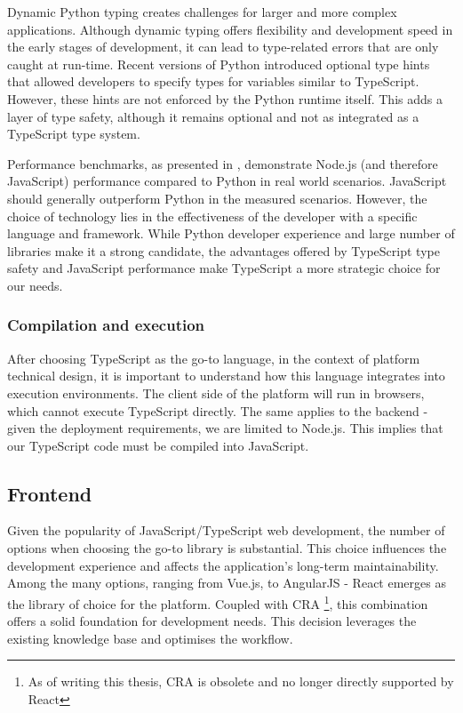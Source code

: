Dynamic Python typing creates challenges for larger and more complex applications.
Although dynamic typing offers flexibility and development speed in the early stages of development, it can lead to type-related errors that are only caught at run-time.
Recent versions of Python introduced optional type hints that allowed developers to specify types for variables similar to TypeScript.
However, these hints are not enforced by the Python runtime itself.
This adds a layer of type safety, although it remains optional and not as integrated as a TypeScript type system.

Performance benchmarks, as presented in \cite{PerformancePythonNode}, demonstrate Node.js (and therefore JavaScript) performance compared to Python in real world scenarios.
JavaScript should generally outperform Python in the measured scenarios.
However, the choice of technology lies in the effectiveness of the developer with a specific language and framework.
While Python developer experience and large number of libraries make it a strong candidate, the advantages offered by TypeScript type safety and JavaScript performance make TypeScript a more strategic choice for our needs.

% 

\subsubsection{Compilation and execution}
\label{subsubsec:compilation-execution}
After choosing TypeScript as the go-to language, in the context of platform technical design, it is important to understand how this language integrates into execution environments.
The client side of the platform will run in browsers, which cannot execute TypeScript directly.
The same applies to the backend - given the deployment requirements, we are limited to Node.js.
This implies that our TypeScript code must be compiled into JavaScript.

\subsection{Frontend}
\label{subsec:frontend-library}
Given the popularity of JavaScript/TypeScript web development, the number of options when choosing the go-to library is substantial.
This choice influences the development experience and affects the application's long-term maintainability. 
Among the many options, ranging from Vue.js, to AngularJS - React emerges as the library of choice for the platform. 
Coupled with \ac{CRA} \footnote{As of writing this thesis, \ac{CRA} is obsolete and no longer directly supported by React}, this combination offers a solid foundation for development needs.
This decision leverages the existing knowledge base and optimises the workflow. 

